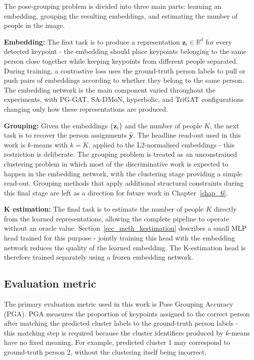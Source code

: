 The pose-grouping problem is divided into three main parts:
learning an embedding,
grouping the resulting embeddings,
and estimating the number of people in the image.

\textbf{Embedding:}
The first task is to produce a representation $\mathbf{z}_i \in \mathbb{R}^{d}$ for every detected keypoint -
the embedding should place keypoints belonging to the same person close together
while keeping keypoints from different people separated.
During training,
a contrastive loss uses the ground-truth person labels
to pull or push pairs of embeddings according to whether they belong to the same person.
The embedding network is the main component varied throughout the experiments,
with PG-GAT, SA-DMoN, hyperbolic, and TriGAT configurations
changing only how these representations are produced.

\textbf{Grouping:}
Given the embeddings $\{\mathbf{z}_i\}$ and the number of people $K$,
the next task is to recover the person assignments $\hat{\mathbf{y}}$.
The headline read-out used in this work is $k$-means with $k=K$,
applied to the L2-normalised embeddings -
this restriction is deliberate.
The grouping problem is treated as an unconstrained clustering problem
in which most of the discriminative work is expected to happen in the embedding network,
with the clustering stage providing a simple read-out.
Grouping methods that apply additional structural constraints during this final stage
are left as a direction for future work in Chapter~\ref{chap_6}.

\textbf{K estimation:}
The final task is to estimate the number of people $K$ directly from the learned representations,
allowing the complete pipeline to operate without an oracle value.
Section~\ref{sec_meth_kestimation} describes a small MLP head trained for this purpose -
jointly training this head with the embedding network
reduces the quality of the learned embedding.
The K-estimation head is therefore trained separately using a frozen embedding network.

\subsection{Evaluation metric}
\label{sec_meth_problem_pga}

The primary evaluation metric used in this work is Pose Grouping Accuracy (PGA).
PGA measures the proportion of keypoints assigned to the correct person
after matching the predicted cluster labels to the ground-truth person labels -
this matching step is required because the cluster identifiers produced by $k$-means have no fixed meaning.
For example,
predicted cluster 1 may correspond to ground-truth person 2,
without the clustering itself being incorrect.

